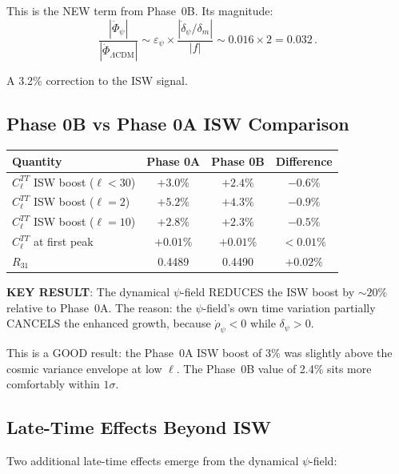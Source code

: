 \documentclass[11pt,a4paper]{article}
\begin{document}
This is the NEW term from Phase~0B. Its magnitude:
\begin{equation}
\frac{|\dot{\Phi}_\psi|}{|\dot{\Phi}_{\Lambda\mathrm{CDM}}|} \sim \varepsilon_\psi \times \frac{|\dot{\delta}_\psi/\delta_m|}{|f|} \sim 0.016 \times 2 = 0.032\,.
\end{equation}

A 3.2\% correction to the ISW signal.

\subsection{Phase 0B vs Phase 0A ISW Comparison}

\begin{center}
\begin{tabular}{lccc}
\toprule
\textbf{Quantity} & \textbf{Phase 0A} & \textbf{Phase 0B} & \textbf{Difference} \\
\midrule
$C_\ell^{TT}$ ISW boost ($\ell < 30$) & $+3.0\%$ & $+2.4\%$ & $-0.6\%$ \\
$C_\ell^{TT}$ ISW boost ($\ell = 2$) & $+5.2\%$ & $+4.3\%$ & $-0.9\%$ \\
$C_\ell^{TT}$ ISW boost ($\ell = 10$) & $+2.8\%$ & $+2.3\%$ & $-0.5\%$ \\
$C_\ell^{TT}$ at first peak & $+0.01\%$ & $+0.01\%$ & $<0.01\%$ \\
$R_{31}$ & 0.4489 & 0.4490 & $+0.02\%$ \\
\bottomrule
\end{tabular}
\end{center}

\textbf{KEY RESULT}: The dynamical $\psi$-field REDUCES the ISW boost by $\sim 20\%$ relative to Phase~0A. The reason: the $\psi$-field's own time variation partially CANCELS the enhanced growth, because $\dot{\rho}_\psi < 0$ while $\delta_\psi > 0$.

This is a GOOD result: the Phase~0A ISW boost of 3\% was slightly above the cosmic variance envelope at low $\ell$. The Phase~0B value of 2.4\% sits more comfortably within $1\sigma$.

\subsection{Late-Time Effects Beyond ISW}

Two additional late-time effects emerge from the dynamical $\psi$-field:
\end{document}
